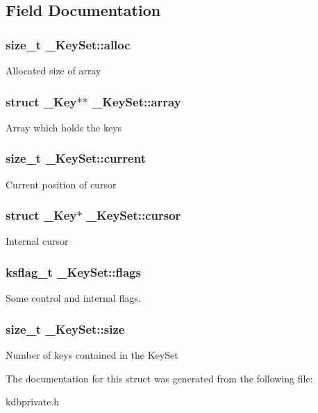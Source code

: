 \subsection{Field Documentation}
\hypertarget{struct__KeySet_ac421dbe2138bb4317996a480a6dae904}{
\subsubsection[{alloc}]{\setlength{\rightskip}{0pt plus 5cm}size\_\-t {\bf \_\-KeySet::alloc}}}
\label{struct__KeySet_ac421dbe2138bb4317996a480a6dae904}
Allocated size of array \hypertarget{struct__KeySet_ae1d1a4e056f483d59503d85d639e186b}{
\subsubsection[{array}]{\setlength{\rightskip}{0pt plus 5cm}struct {\bf \_\-Key}$\ast$$\ast$ {\bf \_\-KeySet::array}}}
\label{struct__KeySet_ae1d1a4e056f483d59503d85d639e186b}
Array which holds the keys \hypertarget{struct__KeySet_a68da1e55ecaf7e8d555cf61c8fda95d9}{
\subsubsection[{current}]{\setlength{\rightskip}{0pt plus 5cm}size\_\-t {\bf \_\-KeySet::current}}}
\label{struct__KeySet_a68da1e55ecaf7e8d555cf61c8fda95d9}
Current position of cursor \hypertarget{struct__KeySet_ae1f826d1e8848e43e4432d1bc8316e65}{
\subsubsection[{cursor}]{\setlength{\rightskip}{0pt plus 5cm}struct {\bf \_\-Key}$\ast$ {\bf \_\-KeySet::cursor}}}
\label{struct__KeySet_ae1f826d1e8848e43e4432d1bc8316e65}
Internal cursor \hypertarget{struct__KeySet_aa8da9b8e25533547f9eeb4e5c3227c74}{
\subsubsection[{flags}]{\setlength{\rightskip}{0pt plus 5cm}ksflag\_\-t {\bf \_\-KeySet::flags}}}
\label{struct__KeySet_aa8da9b8e25533547f9eeb4e5c3227c74}
Some control and internal flags. \hypertarget{struct__KeySet_aecb83d70eff913f1332593c179185125}{
\subsubsection[{size}]{\setlength{\rightskip}{0pt plus 5cm}size\_\-t {\bf \_\-KeySet::size}}}
\label{struct__KeySet_aecb83d70eff913f1332593c179185125}
Number of keys contained in the KeySet 

The documentation for this struct was generated from the following file:\begin{DoxyCompactItemize}
\item 
kdbprivate.h\end{DoxyCompactItemize}
